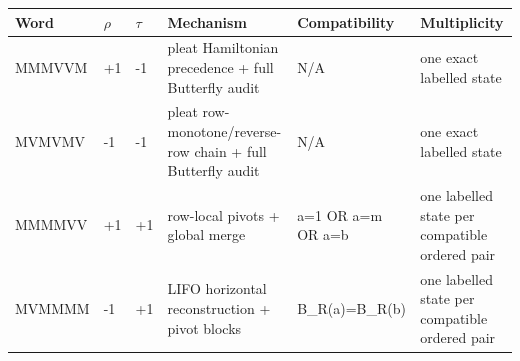 \begin{tabular}{llllll}
\toprule
Word & $\rho$ & $\tau$ & Mechanism & Compatibility & Multiplicity \\
\midrule
MMMVVM & +1 & -1 & pleat Hamiltonian precedence + full Butterfly audit & N/A & one exact labelled state \\
MVMVMV & -1 & -1 & pleat row-monotone/reverse-row chain + full Butterfly audit & N/A & one exact labelled state \\
MMMMVV & +1 & +1 & row-local pivots + global merge & a=1 OR a=m OR a=b & one labelled state per compatible ordered pair \\
MVMMMM & -1 & +1 & LIFO horizontal reconstruction + pivot blocks & B\_R(a)=B\_R(b) & one labelled state per compatible ordered pair \\
\bottomrule
\end{tabular}
